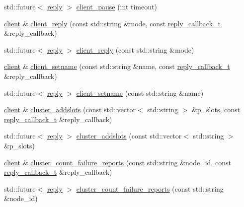 \begin{DoxyCompactItemize}
std\+::future$<$ \hyperlink{classcpp__redis_1_1reply}{reply} $>$ \hyperlink{classcpp__redis_1_1client_a2c73a6f9b2e3f1a0afbaca9fddd29199}{client\+\_\+pause} (int timeout)
\item 
\hyperlink{classcpp__redis_1_1client}{client} \& \hyperlink{classcpp__redis_1_1client_a5e49e9bf9bb72659b33013fac751a712}{client\+\_\+reply} (const std\+::string \&mode, const \hyperlink{classcpp__redis_1_1client_a061a1140d36d2eaeda82b09a0bb3f9f2}{reply\+\_\+callback\+\_\+t} \&reply\+\_\+callback)
\item 
std\+::future$<$ \hyperlink{classcpp__redis_1_1reply}{reply} $>$ \hyperlink{classcpp__redis_1_1client_a1b378de0c1805069b9bbecd4fca4091c}{client\+\_\+reply} (const std\+::string \&mode)
\item 
\hyperlink{classcpp__redis_1_1client}{client} \& \hyperlink{classcpp__redis_1_1client_a5c7f977196c1c00e3c732615c0d86ae7}{client\+\_\+setname} (const std\+::string \&name, const \hyperlink{classcpp__redis_1_1client_a061a1140d36d2eaeda82b09a0bb3f9f2}{reply\+\_\+callback\+\_\+t} \&reply\+\_\+callback)
\item 
std\+::future$<$ \hyperlink{classcpp__redis_1_1reply}{reply} $>$ \hyperlink{classcpp__redis_1_1client_aa1ab41fda6b2536f652720b7720a0b63}{client\+\_\+setname} (const std\+::string \&name)
\item 
\hyperlink{classcpp__redis_1_1client}{client} \& \hyperlink{classcpp__redis_1_1client_ac156d5593e1800742188f0eee9016a84}{cluster\+\_\+addslots} (const std\+::vector$<$ std\+::string $>$ \&p\+\_\+slots, const \hyperlink{classcpp__redis_1_1client_a061a1140d36d2eaeda82b09a0bb3f9f2}{reply\+\_\+callback\+\_\+t} \&reply\+\_\+callback)
\item 
std\+::future$<$ \hyperlink{classcpp__redis_1_1reply}{reply} $>$ \hyperlink{classcpp__redis_1_1client_a0e14578c1addf1de66745a8a95e66aeb}{cluster\+\_\+addslots} (const std\+::vector$<$ std\+::string $>$ \&p\+\_\+slots)
\item 
\hyperlink{classcpp__redis_1_1client}{client} \& \hyperlink{classcpp__redis_1_1client_a757c2a5c8e5b42ccd3930d89d739f602}{cluster\+\_\+count\+\_\+failure\+\_\+reports} (const std\+::string \&node\+\_\+id, const \hyperlink{classcpp__redis_1_1client_a061a1140d36d2eaeda82b09a0bb3f9f2}{reply\+\_\+callback\+\_\+t} \&reply\+\_\+callback)
\item 
std\+::future$<$ \hyperlink{classcpp__redis_1_1reply}{reply} $>$ \hyperlink{classcpp__redis_1_1client_af1ff307eb9feb58b48b11bda78131a20}{cluster\+\_\+count\+\_\+failure\+\_\+reports} (const std\+::string \&node\+\_\+id)

\end{DoxyCompactItemize}
